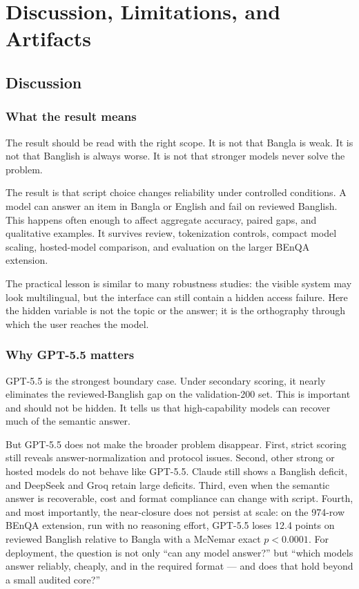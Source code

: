 \chapter{Discussion, Limitations, and Artifacts}

\section{Discussion}

\subsection{What the result means}

The result should be read with the right scope. It is not that Bangla is weak. It is not that Banglish is always worse. It is not that stronger models never solve the problem.

The result is that script choice changes reliability under controlled conditions. A model can answer an item in Bangla or English and fail on reviewed Banglish. This happens often enough to affect aggregate accuracy, paired gaps, and qualitative examples. It survives review, tokenization controls, compact model scaling, hosted-model comparison, and evaluation on the larger BEnQA extension.

The practical lesson is similar to many robustness studies: the visible system may look multilingual, but the interface can still contain a hidden access failure. Here the hidden variable is not the topic or the answer; it is the orthography through which the user reaches the model.

\subsection{Why GPT-5.5 matters}

GPT-5.5 is the strongest boundary case. Under secondary scoring, it nearly eliminates the reviewed-Banglish gap on the validation-200 set. This is important and should not be hidden. It tells us that high-capability models can recover much of the semantic answer.

But GPT-5.5 does not make the broader problem disappear. First, strict scoring still reveals answer-normalization and protocol issues. Second, other strong or hosted models do not behave like GPT-5.5. Claude still shows a Banglish deficit, and DeepSeek and Groq retain large deficits. Third, even when the semantic answer is recoverable, cost and format compliance can change with script. Fourth, and most importantly, the near-closure does not persist at scale: on the 974-row BEnQA extension, run with no reasoning effort, GPT-5.5 loses 12.4 points on reviewed Banglish relative to Bangla with a McNemar exact $p < 0.0001$. For deployment, the question is not only ``can any model answer?'' but ``which models answer reliably, cheaply, and in the required format --- and does that hold beyond a small audited core?''

